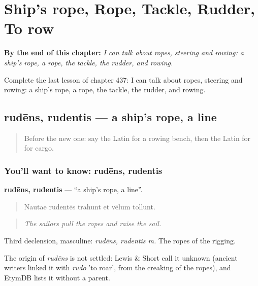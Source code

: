 
\chapter{Ship's rope, Rope, Tackle, Rudder, To row}
\label{ch:la-ship-s-rope-rope-tackle-rudder-to-row}

\begin{chapteropening}
\textbf{By the end of this chapter:} \emph{I can talk about ropes, steering and rowing: a ship's rope, a rope, the tackle, the rudder, and rowing.}

Complete the last lesson of chapter 437: I can talk about ropes, steering and rowing: a ship's rope, a rope, the tackle, the rudder, and rowing.
\end{chapteropening}

\section[rudēns, rudentis]{rudēns, rudentis — a ship's rope, a line}

\label{lesson:LA-C437-rudens}



\begin{quote}
Before the new one: say the Latin for a rowing bench, then the Latin for for cargo.
\end{quote}

\subsection*{You'll want to know: rudēns, rudentis}
\textbf{rudēns, rudentis} — \textquotedblleft{}a ship's rope, a line\textquotedblright{}.

\begin{quote}
Nautae rudentēs trahunt et vēlum tollunt.
\end{quote}

\begin{quote}
\emph{The sailors pull the ropes and raise the sail.}
\end{quote}

Third declension, masculine: \emph{rudēns, rudentis m.} The ropes of the rigging.

\begin{cousinweb}
The origin of \emph{rudēns} is not settled: Lewis \& Short call it unknown (ancient writers linked it with \emph{rudō} 'to roar', from the creaking of the ropes), and EtymDB lists it without a parent.
\end{cousinweb}

